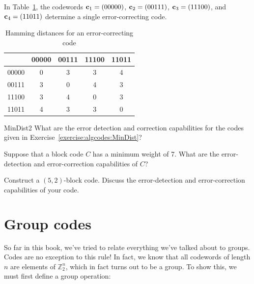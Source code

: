  \begin{example}{}
In Table~\ref{algcodes:table2}, the codewords ${\bold c}_1 = (00000)$, ${\bold c}_2 = (00111)$,
${\bold c}_3 = (11100)$, and ${\bold c}_4 = (11011)$ determine a
single error-correcting code.  
\end{example}
  
\begin{table}[htb]
\caption{ Hamming distances for an error-correcting code\label{algcodes:table2}}{\small
\begin{center}
\begin{tabular}{|c|cccc|}
\hline
      & 00000 & 00111 & 11100 & 11011 \\ \hline
00000 & 0     & 3     & 3     & 4 \\
00111 & 3     & 0     & 4     & 3 \\
11100 & 3     & 4     & 0     & 3 \\
11011 & 4     & 3     & 3     & 0 \\
\hline
\end{tabular}
\end{center}
}
\end{table}
 
 \begin{exercise}{MinDist2}
What are the error detection and correction capabilities for the codes given in Exercise~\ref{exercise:algcodes:MinDist}? 
\end{exercise} 
 
\begin{exercise}{}
Suppose that a  block code $C$ has a minimum weight of 7. What are the
error-detection and error-correction capabilities of $C$?
\end{exercise}
 
 \begin{exercise}{}
Construct a $(5,2)$-block code. Discuss the error-detection and
error-correction capabilities of your code.
 \end{exercise}
 
\section{Group codes\quad
{}}
\label{sec:ErrorAndCorrectionCode:GroupCodes}

So far in this book, we've tried to relate everything we've talked about to groups. Codes are no exception to this rule!  In fact, we know that all codewords of length $n$ are elements of $\mathbb{Z}_2^n$, which in fact turns out to be a group. To show this, we must first define a group operation:

